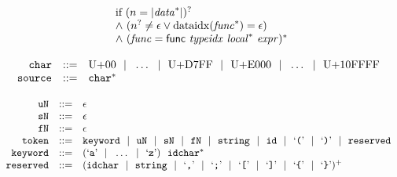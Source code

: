 $$\begin{array}[t]{@{}lrrl@{}l@{}l@{}l@{}}
{\begin{array}[t]{@{}l@{}l@{}l@{}}
 \multicolumn{3}{@{}l@{}}{\quad
\begin{array}[t]{@{}l@{}}
\quad
\begin{array}[t]{@{}l@{}}
\mbox{if}~ (n = {|{{\mathit{data}}^\ast}|})^? \\
{\land}~ ({n^?} \neq \epsilon \lor {\mathrm{dataidx}}({{\mathit{func}}^\ast}) = \epsilon) \\
{\land}~ ({\mathit{func}} = \mathsf{func}~{\mathit{typeidx}}~{{\mathit{local}}^\ast}~{\mathit{expr}})^\ast \\
\end{array} \\
\end{array}
} \\
\end{array}
} \\
\end{array}
$$

\vspace{1ex}

$$
\begin{array}[t]{@{}lrrl@{}l@{}l@{}l@{}}
& {\mathtt{char}} & ::= & \mathrm{U{+}00} ~~|~~ \ldots ~~|~~ \mathrm{U{+}D7FF} ~~|~~ \mathrm{U{+}E000} ~~|~~ \ldots ~~|~~ \mathrm{U{+}10FFFF} \\
& {\mathtt{source}} & ::= & {{\mathtt{char}}^\ast} \\
\end{array}
$$

\vspace{1ex}

$$
\begin{array}[t]{@{}lrrl@{}l@{}l@{}l@{}}
& {\mathtt{uN}} & ::= & \epsilon \\
& {\mathtt{sN}} & ::= & \epsilon \\
& {\mathtt{fN}} & ::= & \epsilon \\
& {\mathtt{token}} & ::= & {\mathtt{keyword}} ~~|~~ {\mathtt{uN}} ~~|~~ {\mathtt{sN}} ~~|~~ {\mathtt{fN}} ~~|~~ {\mathtt{string}} ~~|~~ {\mathtt{id}} ~~|~~ \mbox{‘\texttt{{(}}’} ~~|~~ \mbox{‘\texttt{{)}}’} ~~|~~ {\mathtt{reserved}} \\
& {\mathtt{keyword}} & ::= & (\mbox{‘\texttt{a}’} ~~|~~ \ldots ~~|~~ \mbox{‘\texttt{z}’})~~{{\mathtt{idchar}}^\ast} \\
& {\mathtt{reserved}} & ::= & {({\mathtt{idchar}} ~~|~~ {\mathtt{string}} ~~|~~ \mbox{‘\texttt{,}’} ~~|~~ \mbox{‘\texttt{;}’} ~~|~~ \mbox{‘\texttt{{[}}’} ~~|~~ \mbox{‘\texttt{{]}}’} ~~|~~ \mbox{‘\texttt{{\{}}’} ~~|~~ \mbox{‘\texttt{{\}}}’})^{+}} \\
\end{array}
$$

